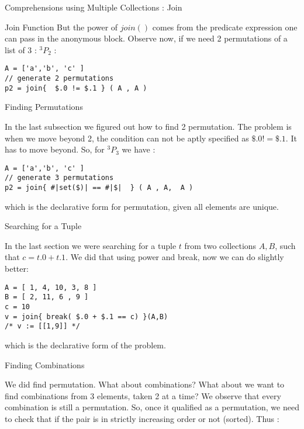 \begin{section}{Comprehensions using Multiple Collections : Join}
\begin{subsection}{Join Function}
But the power of $join()$ comes from the predicate expression one can pass in 
the anonymous block. Observe now, if we need 2 permutations of a list of 3 : $^3P_2$ :

\begin{lstlisting}[style=JexlStyle]
A = ['a','b', 'c' ]
// generate 2 permutations 
p2 = join{  $.0 != $.1 } ( A , A ) 
\end{lstlisting}
 
\end{subsection}

\begin{subsection}{Finding Permutations }

In the last subsection we figured out how to find 2 permutation.
The problem is when we move beyond 2, the condition can not be aptly specified as $\$.0 != \$.1 $.
It has to move beyond. So, for $^3P_3$ we have :

\begin{lstlisting}[style=JexlStyle]
A = ['a','b', 'c' ]
// generate 3 permutations 
p2 = join{ #|set($)| == #|$|  } ( A , A,  A ) 
\end{lstlisting}

which is the declarative form for permutation, given all elements are unique. 
\end{subsection}

\begin{subsection}{Searching for a Tuple }

In the last section we were searching for a tuple $t$ from two collections $A,B$,
such that $c = t.0 + t.1$. We did that using power and break, now 
we can do slightly better:

\begin{lstlisting}[style=JexlStyle]
A = [ 1, 4, 10, 3, 8 ] 
B = [ 2, 11, 6 , 9 ]
c = 10
v = join{ break( $.0 + $.1 == c) }(A,B) 
/* v := [[1,9]] */
\end{lstlisting}

which is the declarative form of the problem. 
\end{subsection}

\begin{subsection}{Finding Combinations}

We did find permutation. What about combinations?
What about we want to find combinations from 3 elements, 
taken 2 at a time? We observe that every combination is still a permutation.
So, once it qualified as a permutation, we need to check that if the pair
is in strictly increasing order or not (sorted). Thus :


\end{subsection}
\end{section}
